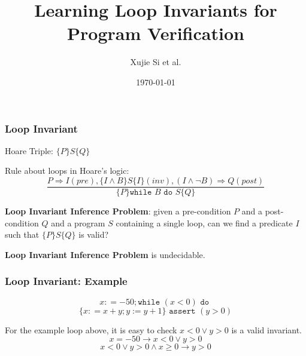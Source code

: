 \documentclass[11pt]{beamer}
\title{Learning Loop Invariants for Program Verification}
\date{\today}
\author{Xujie Si et al.}
\begin{document}
\maketitle
\begin{frame}\frametitle{Loop Invariant}
Hoare Triple: $\{P\}S\{Q\}$

Rule about loops in Hoare's logic:
\[\dfrac{P\Rightarrow I (pre), \{I\wedge B\}S\{I\} (inv), (I\wedge \neg B)\Rightarrow Q (post)}{\{P\}\texttt{while } B \texttt{ do } S \{Q\}}\]

\textbf{Loop Invariant Inference Problem}: given a pre-condition $P$ and a post-condition $Q$ and a program $S$ containing a single loop, can we find a predicate $I$ such that $\{P\}S\{Q\}$ is valid?

\textbf{Loop Invariant Inference Problem} is undecidable.

\end{frame}


\begin{frame}\frametitle{Loop Invariant: Example}
\begin{example}

\[x : = -50; \texttt{while } (x < 0) \texttt{ do }\]
\[\{x : = x + y; y := y + 1\} \texttt{ assert } (y > 0)\]

\end{example}
For the example loop above, it is easy to check $x < 0 \vee y > 0$ is a valid invariant.
\[x = -50 \rightarrow x < 0\vee y > 0\]
\[x < 0 \vee y > 0 \wedge x \ge 0 \rightarrow y > 0 \]
\end{frame}
\end{document}
